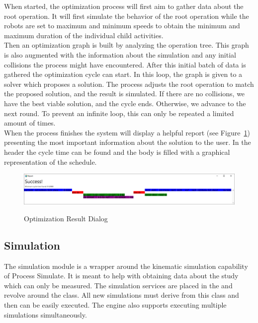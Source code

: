When started, the optimization process will first aim to gather data about the root operation. It will first simulate the behavior of the root operation while the robots are set to maximum and minimum speeds to obtain the minimum and maximum duration of the individual child activities.\\

Then an optimization graph is built by analyzing the operation tree. This graph is also augmented with the information about the simulation and any initial collisions the process might have encountered. After this initial batch of data is gathered the optimization cycle can start. In this loop, the graph is given to a solver which proposes a solution. The process adjusts the root operation to match the proposed solution, and the result is simulated. If there are no collisions, we have the best viable solution, and the cycle ends. Otherwise, we advance to the next round. To prevent an infinite loop, this can only be repeated a limited amount of times. \\

When the process finishes the system will display a helpful report (see Figure~\ref{fig:DialogOptimizationResult}) presenting the most important information about the solution to the user. In the header the cycle time can be found and the body is filled with a graphical representation of the schedule.  

\begin{figure}[ht]
	\caption{Optimization Result Dialog}
	\centering
	\includegraphics[width=\textwidth]{dialog_optimizationresult}
	\label{fig:DialogOptimizationResult}
\end{figure}

\subsection{Simulation}

The simulation module is a wrapper around the kinematic simulation capability of Process Simulate. It is meant to help with obtaining data about the study which can only be measured. The simulation services are placed in the  and revolve around the  class. All new simulations must derive from this class and then can be easily executed. The engine also supports executing multiple simulations simultaneously. \\

